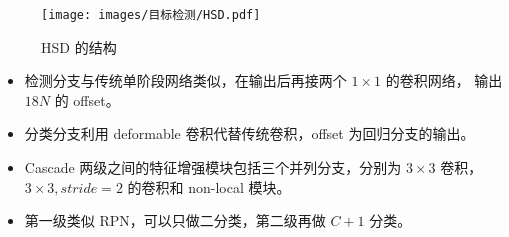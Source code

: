 \begin{figure}[ht]
  \centering
  \texttt{[image: images/目标检测/HSD.pdf]}
  \caption{HSD 的结构}
  \label{fig:hsd}
\end{figure}

\begin{itemize}
  \item 检测分支与传统单阶段网络类似，在输出后再接两个 $1 \times 1$ 的卷积网络，
    输出 $18N$ 的 offset。 
  \item 分类分支利用 deformable 卷积代替传统卷积，offset 为回归分支的输出。
  \item Cascade 两级之间的特征增强模块包括三个并列分支，分别为 $3 \times 3$ 卷积，
    $3 \times 3, stride=2$ 的卷积和 non-local 模块。
  \item 第一级类似 RPN，可以只做二分类，第二级再做 $C+1$ 分类。
\end{itemize}

